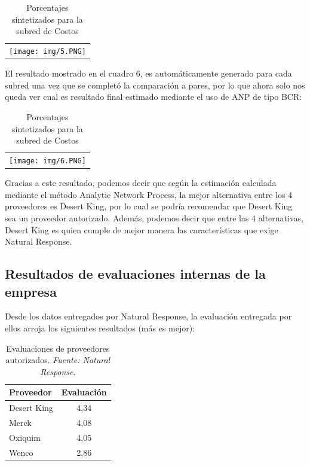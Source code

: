 \documentclass[12pt,twocolumn]{article}
\begin{document}
\begin{table}[h]
\centering
\begin{tabular}{c}
\texttt{[image: img/5.PNG]}
\end{tabular}
\caption{Porcentajes sintetizados para la subred de Costos}
\label{tab:Porcentajes sintetizados para la subred de Costos}
\end{table}

El resultado mostrado en el cuadro 6, es automáticamente generado para cada subred una vez que se completó la comparación a pares, por lo que ahora solo nos queda ver cual es resultado final estimado mediante el uso de ANP de tipo BCR:

\begin{table}[h]
\centering
\begin{tabular}{c}
\texttt{[image: img/6.PNG]}
\end{tabular}
\caption{Porcentajes sintetizados para la subred de Costos}
\label{tab:Porcentajes sintetizados para la subred de Costos}
\end{table}

Gracias a este resultado, podemos decir que según la estimación calculada mediante el método Analytic Network Process, la mejor alternativa entre los 4 proveedores es Desert King, por lo cual se podría recomendar que Desert King sea un proveedor autorizado. Además, podemos decir que entre las 4 alternativas, Desert King es quien cumple de mejor manera las características que exige Natural Response.

\newpage
\subsection{Resultados de evaluaciones internas de la empresa}
Desde los datos entregados por Natural Response, la evaluación entregada por ellos arroja los siguientes resultados (más es mejor):

\begin{table}[h]
\centering
\begin{tabular}{|l|c|}
\hline
\textbf{Proveedor} & \textbf{Evaluación}\\
\hline
Desert King & 4,34\\
\hline
Merck & 4,08\\
\hline
Oxiquim & 4,05\\
\hline
Wenco & 2,86\\
\hline
\end{tabular}
\caption{Evaluaciones de proveedores autorizados. \textit{Fuente: Natural Response}.}
\label{tab:tabla de evaluacion}
\end{table}
\end{document}
